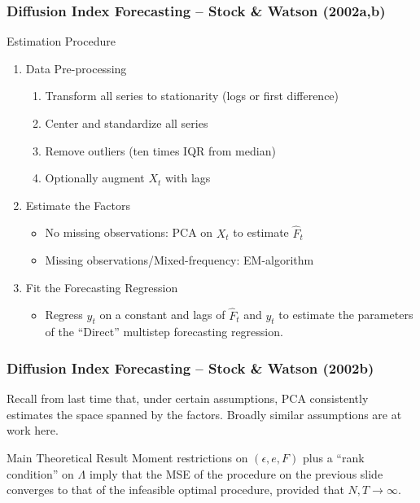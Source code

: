 \documentclass[handout]{beamer}
\begin{document}
\begin{frame}[c]\frametitle{Diffusion Index Forecasting -- Stock \& Watson (2002a,b)}
    
    \begin{block}
    	{Estimation Procedure}
    	\begin{enumerate}
    		\item Data Pre-processing
    			\begin{enumerate}
    			\item Transform all series to stationarity (logs or first difference)
				\item Center and standardize all series
				\item Remove outliers (ten times IQR from median)
				\item Optionally augment $X_t$ with lags
    			\end{enumerate}
    		\item Estimate the Factors
    			\begin{itemize}
    				\item No missing observations: PCA on $X_t$ to estimate $\widehat{F}_t$ 
		\item Missing observations/Mixed-frequency: EM-algorithm
    			\end{itemize}
    		\item Fit the Forecasting Regression
    		\begin{itemize}
    			\item Regress $y_{t}$ on a constant and lags of $\widehat{F}_t$ and $y_t$ to estimate the parameters of the ``Direct'' multistep forecasting regression.
    		\end{itemize}
    	\end{enumerate}
    \end{block}


\end{frame}
\begin{frame}[c]\frametitle{Diffusion Index Forecasting -- Stock \& Watson (2002b)}
    
\alert{Recall from last time that, under certain assumptions, PCA consistently estimates the space spanned by the factors. Broadly similar assumptions are at work here.}

\vspace{2em}

\begin{block}
	{Main Theoretical Result}
	Moment restrictions on $(\epsilon, e, F)$ plus a ``rank condition'' on $\Lambda$ imply that the MSE of the procedure on the previous slide converges to that of the infeasible optimal procedure, provided that  $N,T \rightarrow \infty$.
\end{block}

\end{frame}
\end{document}
